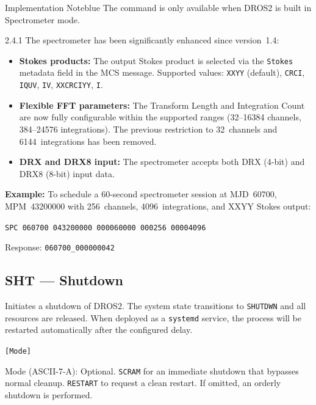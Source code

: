 \begin{calloutBox}{Implementation Note}{blue}
The  command is only available when DROS2 is built in Spectrometer mode.
\end{calloutBox}

\begin{newInVersion}{2.4.1}
The spectrometer has been significantly enhanced since version~1.4:
\begin{itemize}
    \item \textbf{Stokes products:} The output Stokes product is selected via
        the \texttt{Stokes} metadata field in the MCS message.
        Supported values: \texttt{XXYY} (default), \texttt{CRCI},
        \texttt{IQUV}, \texttt{IV}, \texttt{XXCRCIYY}, \texttt{I}.
    \item \textbf{Flexible FFT parameters:} The Transform Length and Integration
        Count are now fully configurable within the supported ranges
        (32--16384 channels, 384--24576 integrations).  The previous restriction
        to 32~channels and 6144~integrations has been removed.
    \item \textbf{DRX and DRX8 input:} The spectrometer accepts both DRX
        (4-bit) and DRX8 (8-bit) input data.
\end{itemize}
\end{newInVersion}

\begin{noteBox}
\textbf{Example:} To schedule a 60-second spectrometer session at MJD~60700,
MPM~43200000 with 256~channels, 4096~integrations, and XXYY Stokes output:

\texttt{SPC 060700 043200000 000060000 000256 00004096}

Response: \texttt{060700\_000000042}
\end{noteBox}

\subsection{SHT --- Shutdown}
\label{cmd:sht}
\begin{description}[style=nextline]
    \item[Description:]
        Initiates a shutdown of DROS2.  The system state transitions
        to \texttt{SHUTDWN} and all resources are released.  When deployed as
        a \texttt{systemd} service, the process will be restarted automatically
        after the configured delay.
    \item[Argument Format:] \texttt{[Mode]}
    \item[Argument:]
        Mode (ASCII-7-A): Optional.  \texttt{SCRAM} for an immediate shutdown
        that bypasses normal cleanup.  \texttt{RESTART} to request a clean
        restart.  If omitted, an orderly shutdown is performed.
\end{description}

